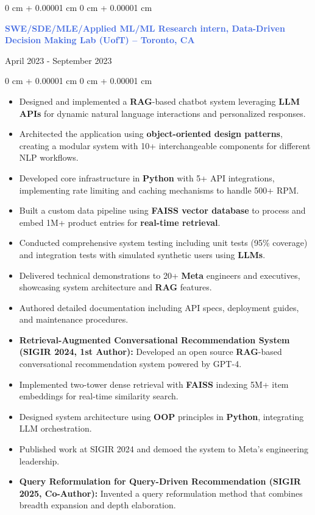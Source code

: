 \documentclass[10pt, letterpaper]{article}
\newenvironment{highlights}{
    \begin{itemize}[
        topsep=0.10 cm,
        parsep=0.10 cm,
        partopsep=0pt,
        itemsep=0pt,
        leftmargin=0 cm + 10pt
    ]
}{
    \end{itemize}
}
\newenvironment{onecolentry}{
    \begin{adjustwidth}{
        0 cm + 0.00001 cm
    }{
        0 cm + 0.00001 cm
    }
}{
    \end{adjustwidth}
}
\newenvironment{twocolentry}[2][]{
    \onecolentry
    \def\secondColumn{#2}
    \setcolumnwidth{\fill, 4.5 cm}
    \begin{paracol}{2}
}{
    \switchcolumn \raggedleft \secondColumn
    \end{paracol}
    \endonecolentry
}
\begin{document}
\vspace{0.25 cm}
\begin{twocolentry}{April 2023 - September 2023}
 \textcolor{royalblue}{\textbf{SWE/SDE/MLE/Applied ML/ML Research intern, Data-Driven Decision Making Lab (UofT) -- Toronto, CA}}
\end{twocolentry}
\begin{onecolentry}
    \begin{highlights}
        \item Designed and implemented a \textbf{RAG}-based chatbot system leveraging \textbf{LLM APIs} for dynamic natural language interactions and personalized responses.
        \item Architected the application using \textbf{object-oriented design patterns}, creating a modular system with 10+ interchangeable components for different NLP workflows.
        \item Developed core infrastructure in \textbf{Python} with 5+ API integrations, implementing rate limiting and caching mechanisms to handle 500+ RPM.
        \item Built a custom data pipeline using \textbf{FAISS vector database} to process and embed 1M+ product entries for \textbf{real-time retrieval}.
        \item Conducted comprehensive system testing including unit tests (95\% coverage) and integration tests with simulated synthetic users using \textbf{LLMs}.
        \item Delivered technical demonstrations to 20+ \textbf{Meta} engineers and executives, showcasing system architecture and \textbf{RAG} features.
        \item Authored detailed documentation including API specs, deployment guides, and maintenance procedures.
        \item \textbf{Retrieval-Augmented Conversational Recommendation System (SIGIR 2024, 1st Author):} Developed an open source \textbf{RAG}-based conversational recommendation system powered by GPT-4.
        \item Implemented two-tower dense retrieval with \textbf{FAISS} indexing 5M+ item embeddings for real-time similarity search.
        \item Designed system architecture using \textbf{OOP} principles in \textbf{Python}, integrating LLM orchestration.
        \item Published work at SIGIR 2024 and demoed the system to Meta’s engineering leadership.
        \item \textbf{Query Reformulation for Query-Driven Recommendation (SIGIR 2025, Co-Author):} Invented a query reformulation method that combines breadth expansion and depth elaboration.

\end{highlights}
\end{onecolentry}
\end{document}
